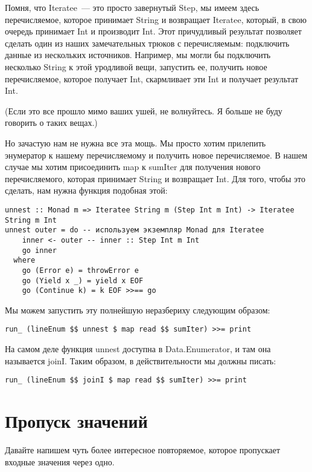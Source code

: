 Помня, что Iteratee~--- это просто завернутый Step, мы имеем здесь перечисляемое, которое принимает String и возвращает Iteratee, который, в свою очередь принимает Int и производит Int. Этот причудливый результат позволяет сделать один из наших замечательных трюков с перечисляемым: подключить данные из нескольких источников. Например, мы могли бы подключить несколько String к этой уродливой вещи, запустить ее, получить новое перечисляемое, которое получает Int, скармливает эти Int и получает результат Int.

(Если это все прошло мимо ваших ушей, не волнуйтесь. Я больше не буду говорить о таких вещах.)

Но зачастую нам не нужна все эта мощь. Мы просто хотим прилепить энумератор к нашему перечисляемому и получить новое перечисляемое. В нашем случае мы хотим присоединить map к sumIter для получения нового перечисляемого, которая принимает String и возвращает Int. Для того, чтобы это сделать, нам нужна функция подобная этой:

\begin{lstlisting}
unnest :: Monad m => Iteratee String m (Step Int m Int) -> Iteratee String m Int
unnest outer = do -- используем экземпляр Monad для Iteratee
    inner <- outer -- inner :: Step Int m Int
    go inner
  where
    go (Error e) = throwError e
    go (Yield x _) = yield x EOF
    go (Continue k) = k EOF >>== go
\end{lstlisting}

Мы можем запустить эту полнейшую неразбериху следующим образом:

\begin{lstlisting}
run_ (lineEnum $$ unnest $ map read $$ sumIter) >>= print
\end{lstlisting}%

На самом деле функция unnest доступна в Data.Enumerator, и там она называется joinI. Таким образом, в действительности мы должны писать:

\begin{lstlisting}
run_ (lineEnum $$ joinI $ map read $$ sumIter) >>= print
\end{lstlisting}%

\section{Пропуск значений}

Давайте напишем чуть более интересное повторяемое, которое пропускает входные значения через одно.

